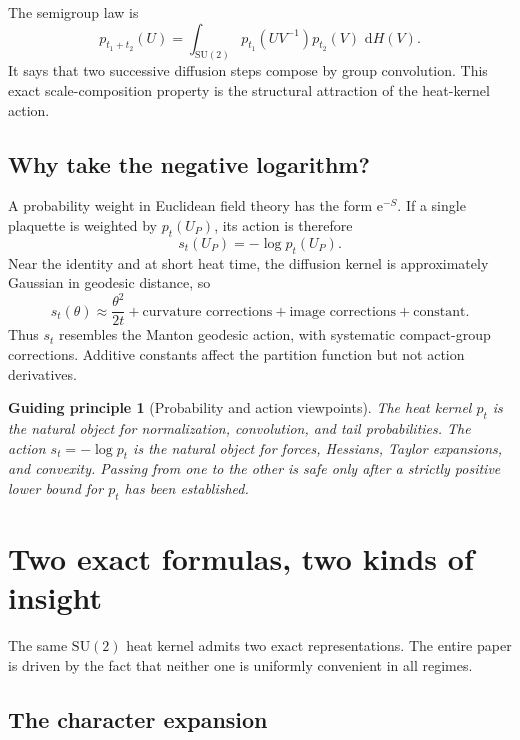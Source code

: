 \documentclass[11pt]{article}
\newtheorem{principle}{Guiding principle}[section]
\theoremstyle{definition}
\newcommand{\SU}{\mathrm{SU}(2)}
\newcommand{\dd}{\,\mathrm{d}}
\newcommand{\e}{\mathrm{e}}
\begin{document}
The semigroup law is
\begin{equation}\label{expl:eq:semigroup}
 p_{t_1+t_2}(U)=\int_{\SU}p_{t_1}(UV^{-1})p_{t_2}(V)\,\dd H(V).
\end{equation}
It says that two successive diffusion steps compose by group convolution.
This exact scale-composition property is the structural attraction of the
heat-kernel action.

\subsection{Why take the negative logarithm?}

A probability weight in Euclidean field theory has the form $\e^{-S}$.  If a
single plaquette is weighted by $p_t(U_P)$, its action is therefore
\begin{equation}\label{expl:eq:action}
 s_t(U_P)=-\log p_t(U_P).
\end{equation}
Near the identity and at short heat time, the diffusion kernel is approximately
Gaussian in geodesic distance, so
\begin{equation}\label{expl:eq:gaussian-action}
 s_t(\theta)\approx\frac{\theta^2}{2t}+\text{curvature corrections}
 +\text{image corrections}+\text{constant}.
\end{equation}
Thus $s_t$ resembles the Manton geodesic action, with systematic compact-group
corrections.  Additive constants affect the partition function but not action
derivatives.

\begin{principle}[Probability and action viewpoints]
The heat kernel $p_t$ is the natural object for normalization, convolution,
and tail probabilities.  The action $s_t=-\log p_t$ is the natural object for
forces, Hessians, Taylor expansions, and convexity.  Passing from one to the
other is safe only after a strictly positive lower bound for $p_t$ has been
established.
\end{principle}

\section{Two exact formulas, two kinds of insight}

The same $\SU$ heat kernel admits two exact representations.  The entire
paper is driven by the fact that neither one is uniformly convenient in all
regimes.

\subsection{The character expansion}
\end{document}
